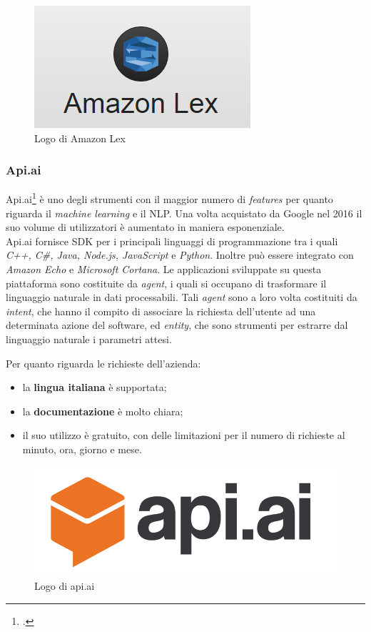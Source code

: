 \begin{figure}[h]
	\centering
	\includegraphics[scale=0.5]{../Immagini/amazon-lex.png}
	\caption{Logo di Amazon Lex}
\end{figure}

\subsubsection{Api.ai}
Api.ai\footcite{apiai} è uno degli strumenti con il maggior numero di \emph{features} per quanto riguarda il \emph{machine learning} e il \gls{NLP}. Una volta acquistato da Google nel 2016 il suo volume di utilizzatori è aumentato in maniera esponenziale. \\
Api.ai fornisce \gls{SDK} per i principali linguaggi di programmazione tra i quali \emph{C++, C\#, Java, Node.js, JavaScript} e \emph{Python}. Inoltre può essere integrato con \emph{Amazon Echo} e \emph{Microsoft Cortana}. Le applicazioni sviluppate su questa piattaforma sono costituite da \emph{agent}, i quali si occupano di trasformare il linguaggio naturale in dati processabili. Tali \emph{agent} sono a loro volta costituiti da \emph{intent}, che hanno il compito di associare la richiesta dell'utente ad una determinata azione del software, ed \emph{entity}, che sono strumenti per estrarre dal linguaggio naturale i parametri attesi.

Per quanto riguarda le richieste dell'azienda:
\begin{itemize}
	\item la \textbf{lingua italiana} è supportata;
	\item la \textbf{documentazione} è molto chiara;
	\item il suo utilizzo è gratuito, con delle limitazioni per il numero di richieste al minuto, ora, giorno e mese.
\end{itemize}

\begin{figure}[h]
	\centering
	\includegraphics[scale=0.25]{../Immagini/apiai.png}
	\caption{Logo di api.ai}
\end{figure}

